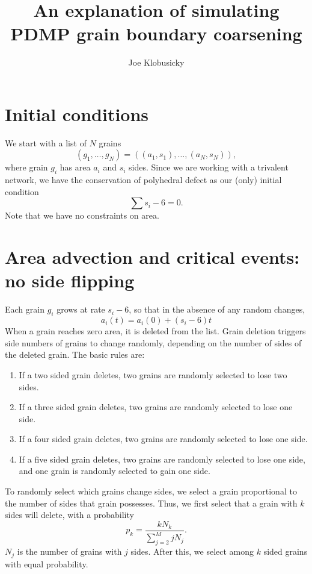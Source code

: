 \documentclass{amsart}
\begin{document}
\title{An explanation of simulating PDMP grain boundary coarsening}
\author{Joe Klobusicky}
\maketitle





\section{Initial conditions}
We start with a list of $N$ grains 
\begin{equation}
(g_1,\dots, g_N) = ((a_1,s_1), \dots, (a_N,s_N)),
\end{equation} 
where grain $g_i$ has area $a_i$ and $s_i$ sides.  Since we are working with a trivalent network, we have the conservation of polyhedral defect as our (only) initial condition
\begin{equation}
\sum s_i-6 = 0.
\end{equation}
Note that we have no constraints on area.  

\section{Area advection and critical events: no side flipping}
Each grain $g_i$ grows at rate $s_i-6$, so that in the absence of any random changes,
\begin{equation} 
a_i(t) = a_i(0)+(s_i-6)t
\end{equation}
When a grain reaches zero area, it is deleted from the list.  Grain deletion triggers side numbers of grains to change randomly, depending on the number of sides of the deleted grain.  The basic rules are:\begin{enumerate}
\item If a two sided grain deletes, two grains are randomly selected to lose two sides.
\item If a three sided grain deletes, two grains are randomly selected to lose one side.
\item If a four sided grain deletes, two grains are randomly selected to lose one side.
\item If a five sided grain deletes, two grains are randomly selected to lose one side, and one grain is randomly selected to gain one side.
\end{enumerate}

To randomly select which grains change sides, we select a grain proportional to the number of sides that grain possesses.  Thus, we first select that a grain with $k$ sides will delete, with a probability 
\begin{equation}
p_k = \frac{kN_k}{\sum_{j=2}^M jN_j}.
\end{equation}
$N_j$ is the number of grains with $j$ sides.  After this, we select among $k$ sided grains with equal probability.  
\end{document}
